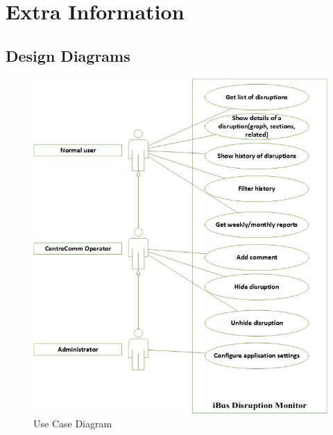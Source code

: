 \chapter{Extra Information}

\section{Design Diagrams}
\begin{figure}[!htb]
\centering
	\includegraphics[scale=0.8]{Figures/UseCases.jpg}
\caption{Use Case Diagram\label{overflow}}
\end{figure}


